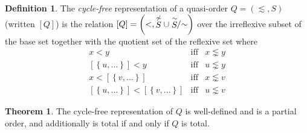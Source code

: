\documentclass[12pt]{article}
\theoremstyle{definition}
\newtheorem{definition}{Definition}[section]
\theoremstyle{theorem}
\newtheorem{theorem}{Theorem}[section]
\def\aset#1{\left\{{#1}\right\}}
\begin{document}
\begin{definition}
  The \emph{cycle-free} representation of a quasi-order
  $Q=(\lesssim,S)$ (written $[Q]$) is the relation \( [Q] = \left(<,
  \stackrel{\not\sim}{S} \cup \stackrel{\sim}{S}\!\!/{\mathord\sim}\right) \) over the irreflexive
  subset of the base set together with the quotient set of the
  reflexive set where
  \begin{eqnarray*}
    x < y &\textrm{iff}& x \lnsim y \\
    {[\aset{u,\ldots}]} < y &\textrm{iff}& u \lnsim y \\
    x < [\aset{v,\ldots}] & \textrm{iff}& x \lnsim v \\
    {[\aset{u,\ldots}]} < [\aset{v,\ldots}] & \textrm{iff} & u \lnsim
    v
  \end{eqnarray*}
\end{definition}
\begin{theorem}
  The cycle-free representation of $Q$ is well-defined and is a
  partial order, and additionally is total if and only if $Q$ is total.
\end{theorem}
\end{document}
